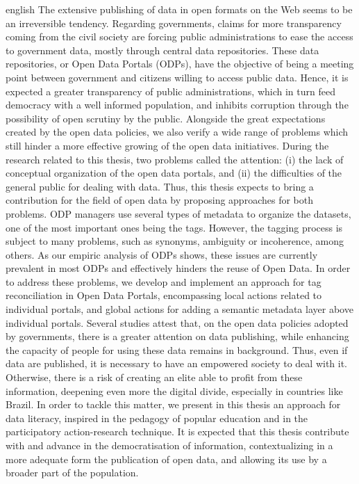 
\begin{resumo}[Abstract]
 \begin{otherlanguage*}{english}
The extensive publishing of data in open formats on the Web seems to be an irreversible tendency.
Regarding governments, claims for more transparency coming from the civil society are forcing public administrations to ease the access to government data, mostly through central data repositories.
These data repositories, or Open Data Portals (ODPs), have the objective of being a meeting point between government and citizens willing to access public data.
Hence, it is expected a greater transparency of public administrations, which in turn feed democracy with a well informed population, and inhibits corruption through the possibility of open scrutiny by the public.
Alongside the great expectations created by the open data policies, we also verify a wide range of problems which still hinder a more effective growing of the open data initiatives.
During the research related to this thesis, two problems called the attention: (i) the lack of conceptual organization of the open data portals, and (ii) the difficulties of the general public for dealing with data.
Thus, this thesis expects to bring a contribution for the field of open data by proposing approaches for both problems.
ODP managers use several types of metadata to organize the datasets, one of the most important ones being the tags.
However, the tagging process is subject to many problems, such as synonyms, ambiguity or incoherence, among others.
As our empiric analysis of ODPs shows, these issues are currently prevalent in most ODPs and effectively hinders the reuse of Open Data.
In order to address these problems, we develop and implement an approach for tag reconciliation in Open Data Portals, encompassing local actions related to individual portals, and global actions for adding a semantic metadata layer above individual portals.
Several studies attest that, on the open data policies adopted by governments, there is a greater attention on data publishing, while enhancing the capacity of people for using these data remains in background. 
Thus, even if data are published, it is necessary to have an empowered society to deal with it.
Otherwise, there is a risk of creating an elite able to profit from these information, deepening even more the digital divide, especially in countries like Brazil.
In order to tackle this matter, we present in this thesis an approach for data literacy, inspired in the pedagogy of popular education and in the participatory action-research technique.
It is expected that this thesis contribute with and advance in the democratisation of information, contextualizing in a more adequate form the publication of open data, and allowing its use by a broader part of the population.



\end{otherlanguage*}
\end{resumo}
